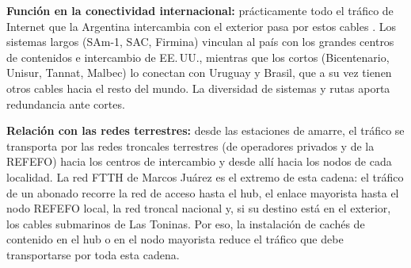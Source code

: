 \textbf{Función en la conectividad internacional:} prácticamente todo el tráfico de Internet que la Argentina intercambia con el exterior pasa por estos cables \cite{libro_catedra}. Los sistemas largos (SAm-1, SAC, Firmina) vinculan al país con los grandes centros de contenidos e intercambio de EE.\,UU., mientras que los cortos (Bicentenario, Unisur, Tannat, Malbec) lo conectan con Uruguay y Brasil, que a su vez tienen otros cables hacia el resto del mundo. La diversidad de sistemas y rutas aporta redundancia ante cortes.

\textbf{Relación con las redes terrestres:} desde las estaciones de amarre, el tráfico se transporta por las redes troncales terrestres (de operadores privados y de la REFEFO) hacia los centros de intercambio y desde allí hacia los nodos de cada localidad. La red FTTH de Marcos Juárez es el extremo de esta cadena: el tráfico de un abonado recorre la red de acceso hasta el hub, el enlace mayorista hasta el nodo REFEFO local, la red troncal nacional y, si su destino está en el exterior, los cables submarinos de Las Toninas. Por eso, la instalación de cachés de contenido en el hub o en el nodo mayorista reduce el tráfico que debe transportarse por toda esta cadena.
